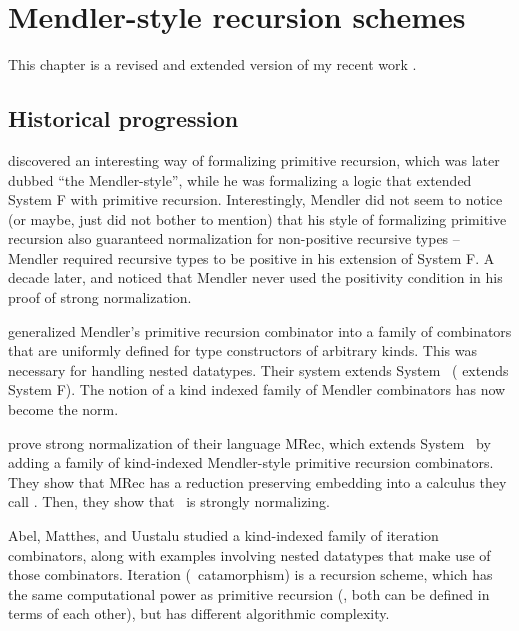 \chapter{Mendler-style recursion schemes}\label{ch:mendler}




This chapter is a revised and extended version of
my recent work \cite{AhnShe11}.



\section{Historical progression}

\citet{Mendler87} discovered an interesting way of formalizing
primitive recursion, which was later dubbed ``the Mendler-style'',
while he was formalizing a logic that extended System \textsf{F} with
primitive recursion. Interestingly, Mendler did not seem to notice
(or maybe, just did not bother to mention) that his style of formalizing
primitive recursion also guaranteed normalization for non-positive recursive
types -- Mendler required recursive types to be positive in his extension of
System \textsf{F}. A decade later, \citet{matthes98phd} and \citet{uustalu98phd}
noticed that Mendler never used the positivity condition in his proof of
strong normalization.

\citet{AbeMat04} generalized Mendler's primitive recursion combinator
\cite{Mendler87} into a family of combinators that are uniformly defined for
type constructors of arbitrary kinds. This was necessary for
handling nested datatypes. Their system extends System \Fw\ 
(\citet{Mendler87} extends System \textsf{F}). The notion
of a kind indexed family of Mendler combinators has now become the norm.

\citet{AbeMat04} prove strong normalization of their language \textsf{MRec},
which extends System \Fw\ by adding a family of kind-indexed Mendler-style
primitive recursion combinators. They show that \textsf{MRec} has
a reduction preserving embedding into a calculus they call \Fixw.
Then, they show that \Fixw\ is strongly normalizing.

Abel, Matthes, and Uustalu \cite{AbeMatUus03,AbeMatUus05} studied
a kind-indexed family of iteration combinators, along with examples
involving nested datatypes that make use of those combinators.
Iteration (\aka\ catamorphism) is a recursion scheme, which has the same
computational power as primitive recursion (\ie, both can be defined
in terms of each other), but has different algorithmic complexity. 

